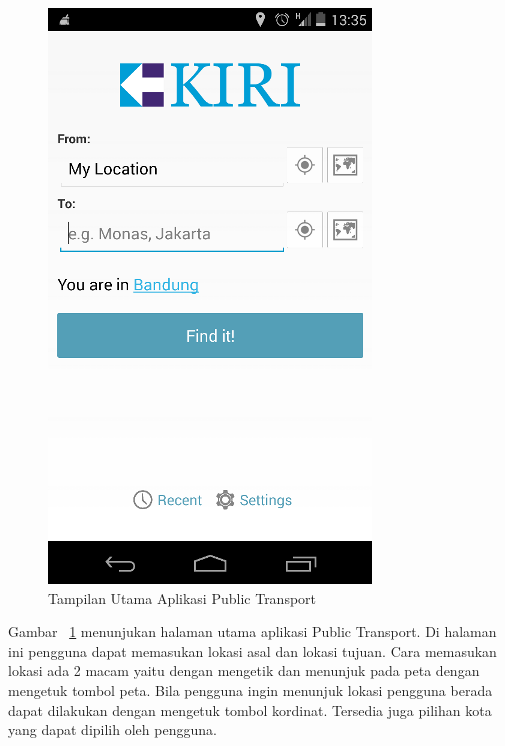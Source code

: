 \begin{figure}[h]
	\centering
		\includegraphics[scale=0.5]{Gambar/KIRI_Android/home}
	\caption{Tampilan Utama Aplikasi Public Transport}
	\label{fig:home}
\end{figure}

Gambar ~\ref{fig:home} menunjukan halaman utama aplikasi Public Transport. Di halaman ini pengguna dapat memasukan lokasi asal dan lokasi tujuan. Cara memasukan lokasi ada 2 macam yaitu dengan mengetik dan menunjuk pada peta dengan mengetuk tombol peta. Bila pengguna ingin menunjuk lokasi pengguna berada dapat dilakukan dengan mengetuk tombol kordinat. Tersedia juga pilihan kota yang dapat dipilih oleh pengguna.

